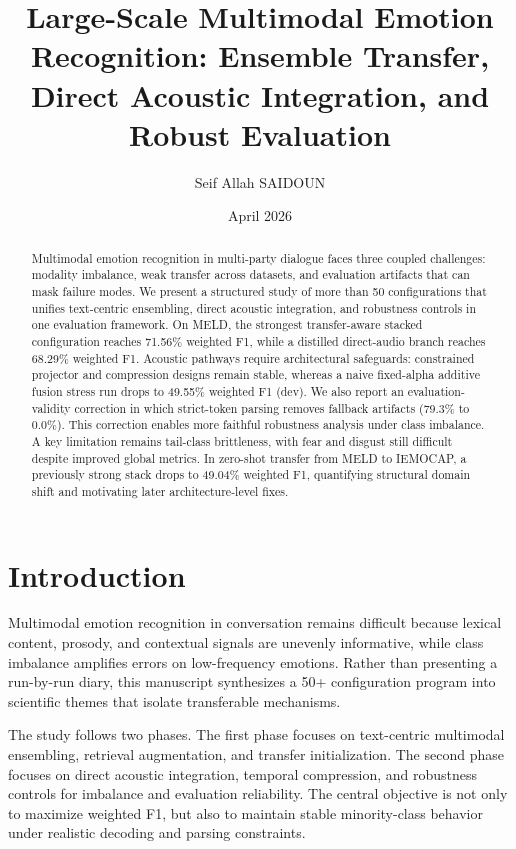\documentclass[11pt,a4paper,twocolumn]{article}
\title{Large-Scale Multimodal Emotion Recognition: Ensemble Transfer, Direct Acoustic Integration, and Robust Evaluation}
\author{Seif Allah SAIDOUN}
\date{April 2026}
\begin{document}
\maketitle

\begin{abstract}
Multimodal emotion recognition in multi-party dialogue faces three coupled challenges: modality imbalance, weak transfer across datasets, and evaluation artifacts that can mask failure modes. We present a structured study of more than 50 configurations that unifies text-centric ensembling, direct acoustic integration, and robustness controls in one evaluation framework. On MELD, the strongest transfer-aware stacked configuration reaches 71.56\% weighted F1, while a distilled direct-audio branch reaches 68.29\% weighted F1. Acoustic pathways require architectural safeguards: constrained projector and compression designs remain stable, whereas a naive fixed-alpha additive fusion stress run drops to 49.55\% weighted F1 (dev). We also report an evaluation-validity correction in which strict-token parsing removes fallback artifacts (79.3\% to 0.0\%). This correction enables more faithful robustness analysis under class imbalance. A key limitation remains tail-class brittleness, with fear and disgust still difficult despite improved global metrics.
In zero-shot transfer from MELD to IEMOCAP, a previously strong stack drops to 49.04\% weighted F1, quantifying structural domain shift and motivating later architecture-level fixes.
\end{abstract}

\section{Introduction}
Multimodal emotion recognition in conversation remains difficult because lexical content, prosody, and contextual signals are unevenly informative, while class imbalance amplifies errors on low-frequency emotions. Rather than presenting a run-by-run diary, this manuscript synthesizes a 50+ configuration program into scientific themes that isolate transferable mechanisms.

The study follows two phases. The first phase focuses on text-centric multimodal ensembling, retrieval augmentation, and transfer initialization. The second phase focuses on direct acoustic integration, temporal compression, and robustness controls for imbalance and evaluation reliability. The central objective is not only to maximize weighted F1, but also to maintain stable minority-class behavior under realistic decoding and parsing constraints.
\end{document}
